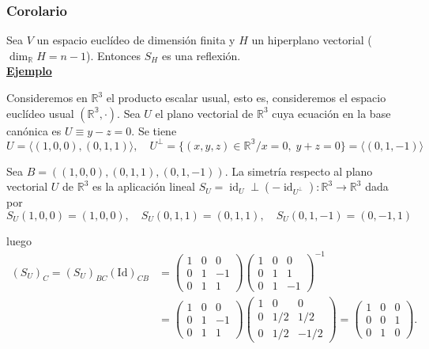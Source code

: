 \documentclass[12pt, a4paper, ones, notitlepage, openany,titlepage]{article}
\newcommand{\ejemplo}{\noindent\underline{\textbf{Ejemplo}}}
\begin{document}
\subsubsection{Corolario}
Sea $V$ un espacio euclídeo de dimensión finita y $H$ un hiperplano vectorial ($\operatorname{dim}_\mathbb{R}H = n - 1$). Entonces $S_H$ es una reflexión.\\

\ejemplo

Consideremos en $\mathbb{R}^{3}$ el producto escalar usual, esto es, consideremos el espacio euclídeo usual $(\mathbb{R^3}, \cdot)$. Sea $U$ el plano vectorial de $\mathbb{R}^{3}$ cuya ecuación en la base canónica es $U\equiv y-z=0$. Se tiene
$$
U=\langle(1,0,0),(0,1,1)\rangle, \quad U^{\perp}=\{(x, y, z) \in \mathbb{R^3} / x = 0, \; y + z = 0\}=\langle(0,1,-1)\rangle
$$

Sea $B=((1,0,0),(0,1,1),(0,1,-1))$. La simetría respecto al plano vectorial $U$ de $\mathbb{R}^{3}$ es la aplicación lineal $S_{U}=\operatorname{id}_{U} \perp\left(-\operatorname{id}_{U^{\perp}}\right): \mathbb{R}^{3} \rightarrow \mathbb{R}^{3}$ dada por
$$
S_{U}(1,0,0)=(1,0,0), \quad S_{U}(0,1,1)=(0,1,1), \quad S_{U}(0,1,-1)=(0,-1,1)
$$

\noindent luego
$$
\begin{aligned}
	\left(S_{U}\right)_{C}=\left(S_{U}\right)_{B C} \operatorname{(Id)}_{C B} & =\left(\begin{array}{rrr}
		1 & 0 & 0 \\
		0 & 1 & -1 \\
		0 & 1 & 1
	\end{array}\right)\left(\begin{array}{rrr}
		1 & 0 & 0 \\
		0 & 1 & 1 \\
		0 & 1 & -1
	\end{array}\right)^{-1} \\
	& =\left(\begin{array}{rrr}
		1 & 0 & 0 \\
		0 & 1 & -1 \\
		0 & 1 & 1
	\end{array}\right)\left(\begin{array}{rrr}
		1 & 0 & 0 \\
		0 & 1 / 2 & 1 / 2 \\
		0 & 1 / 2 & -1 / 2
	\end{array}\right)=\left(\begin{array}{lll}
		1 & 0 & 0 \\
		0 & 0 & 1 \\
		0 & 1 & 0
	\end{array}\right) .
\end{aligned}
$$
\end{document}
